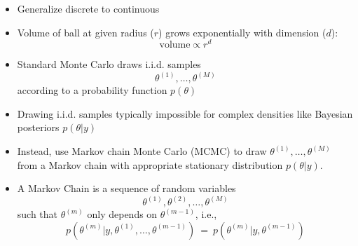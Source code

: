 \documentclass[10pt]{report}
\begin{document}
%
\begin{itemize}
\item Generalize discrete to continuous
\item Volume of ball at given radius ($r$) grows exponentially with
  dimension ($d$):
{\large
\[
\mbox{volume} \propto r^d
\]
}
\vspace*{-18pt}
\end{itemize}




%
\begin{itemize}
\item Standard Monte Carlo draws i.i.d. samples
\[
\theta^{(1)}, \ldots, \theta^{(M)}
\]
according to a probability function $p(\theta)$
\item Drawing i.i.d. samples typically impossible for
  complex densities like Bayesian posteriors $p(\theta|y)$
\item Instead, use Markov chain Monte Carlo (MCMC) to
  draw $\theta^{(1)}, \ldots, \theta^{(M)}$ from a Markov chain
  with appropriate stationary distribution $p(\theta | y)$.
\end{itemize}


%
\begin{itemize}
\item A Markov Chain is a sequence of random variables
\[
\theta^{(1)},
  \theta^{(2)}, \ldots, \theta^{(M)}
\]
such that $\theta^{(m)}$ only depends on $\theta^{(m-1)}$, i.e.,
\[
p(\theta^{(m)} | y, \theta^{(1)}, \ldots, \theta^{(m-1)})
\ = \
p(\theta^{(m)} | y, \theta^{(m-1)})
\]
\end{itemize}
\end{document}
